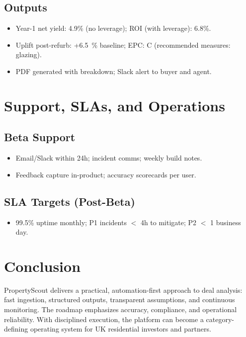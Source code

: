 \documentclass[12pt,a4paper]{article}
\begin{document}
\subsection{Outputs}
\begin{itemize}[leftmargin=1.5em]
  \item Year-1 net yield: 4.9\% (no leverage); ROI (with leverage): 6.8\%.
  \item Uplift post-refurb: +\SI{6.5}{\percent} baseline; EPC: C (recommended measures: glazing).
  \item PDF generated with breakdown; Slack alert to buyer and agent.
\end{itemize}

\section{Support, SLAs, and Operations}
\subsection{Beta Support}
\begin{itemize}[leftmargin=1.5em]
  \item Email/Slack within 24h; incident comms; weekly build notes.
  \item Feedback capture in-product; accuracy scorecards per user.
\end{itemize}

\subsection{SLA Targets (Post-Beta)}
\begin{itemize}[leftmargin=1.5em]
  \item 99.5\% uptime monthly; P1 incidents $<$ 4h to mitigate; P2 $<$ 1 business day.
\end{itemize}

\section{Conclusion}
PropertyScout delivers a practical, automation-first approach to deal analysis: fast ingestion, structured outputs, transparent assumptions, and continuous monitoring. The roadmap emphasizes accuracy, compliance, and operational reliability. With disciplined execution, the platform can become a category-defining operating system for UK residential investors and partners.
\end{document}
